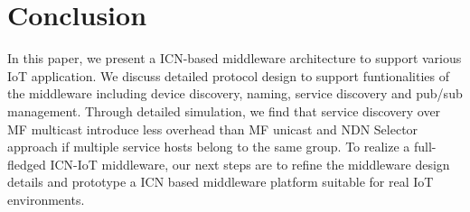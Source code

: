\section{Conclusion}
In this paper, we present a ICN-based middleware architecture to support various IoT application. We discuss detailed protocol design to support funtionalities of the middleware including device discovery, naming, service discovery and pub/sub management. Through detailed simulation, we find that service discovery over MF multicast introduce less overhead than MF unicast and NDN Selector approach if multiple service hosts belong to the same group. To realize a full-fledged ICN-IoT middleware, our next steps are to refine the middleware design details and prototype a ICN based middleware platform suitable for real IoT environments. 